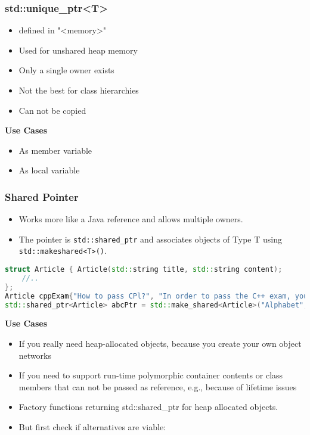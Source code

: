 \subsubsection{std::unique\_ptr<T>}
\begin{itemize}
  \itemsep -0.5em 
  \item defined in "<memory>"
  \item Used for unshared heap memory
  \item Only a single owner exists
  \item Not the best for class hierarchies
  \item Can not be copied
\end{itemize}

\textbf{Use Cases}
\begin{itemize}
  \itemsep -0.5em 
  \item As member variable
  \item As local variable
\end{itemize}


\subsubsection{Shared Pointer}
\begin{itemize}
	\itemsep -0.5em
	\item Works more like a Java reference and allows multiple owners.
	\item The pointer is \lstinline|std::shared_ptr| and associates objects of Type T using \lstinline|std::makeshared<T>()|.
\end{itemize}


\begin{lstlisting}[language=C++]
struct Article { Article(std::string title, std::string content);
	//..
};
Article cppExam{"How to pass CPl?", "In order to pass the C++ exam, you have to..."};
std::shared_ptr<Article> abcPtr = std::make_shared<Article>("Alphabet", "ABCDEFGHIJKLMNOPQRSTUVXYZ");
\end{lstlisting}

\textbf{Use Cases}
\begin{itemize}
  \itemsep 0em 
  \item If you really need heap-allocated objects, because you create your own object networks
  \item  If you need to support run-time polymorphic container contents or class members that can not be passed as reference, e.g., because of lifetime issues 
  \item Factory functions returning std::shared\_ptr for heap allocated objects.
  \item  But first check if alternatives are viable:
\end{itemize}

